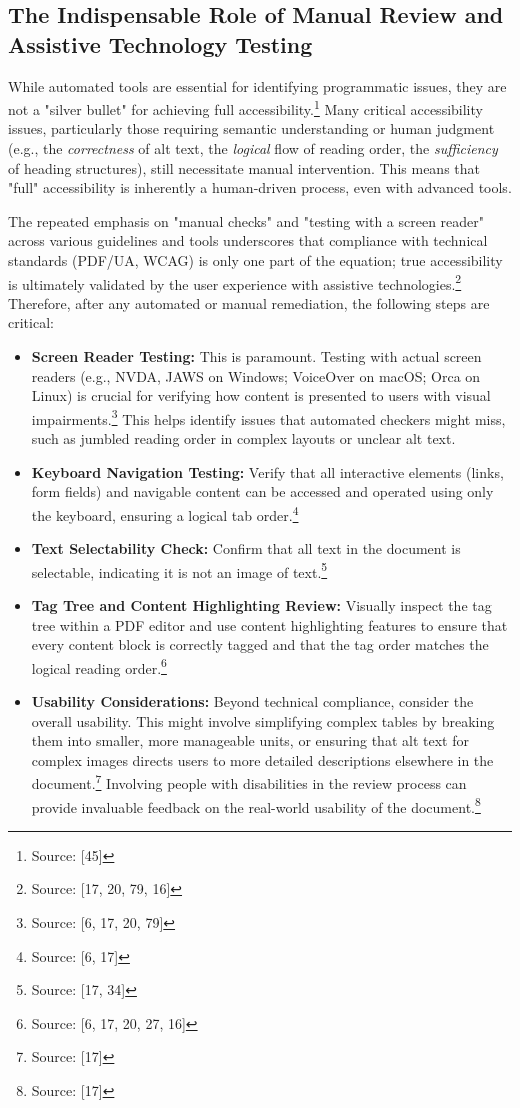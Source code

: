 \subsection{The Indispensable Role of Manual Review and Assistive Technology Testing}

While automated tools are essential for identifying programmatic issues, they are not a "silver bullet" for achieving full accessibility.\footnote{Source: [45]} Many critical accessibility issues, particularly those requiring semantic understanding or human judgment (e.g., the \textit{correctness} of alt text, the \textit{logical} flow of reading order, the \textit{sufficiency} of heading structures), still necessitate manual intervention. This means that "full" accessibility is inherently a human-driven process, even with advanced tools.

The repeated emphasis on "manual checks" and "testing with a screen reader" across various guidelines and tools underscores that compliance with technical standards (PDF/UA, WCAG) is only one part of the equation; true accessibility is ultimately validated by the user experience with assistive technologies.\footnote{Source: [17, 20, 79, 16]} Therefore, after any automated or manual remediation, the following steps are critical:

\begin{itemize}[noitemsep,topsep=0pt]
    \item \textbf{Screen Reader Testing:} This is paramount. Testing with actual screen readers (e.g., NVDA, JAWS on Windows; VoiceOver on macOS; Orca on Linux) is crucial for verifying how content is presented to users with visual impairments.\footnote{Source: [6, 17, 20, 79]} This helps identify issues that automated checkers might miss, such as jumbled reading order in complex layouts or unclear alt text.
    \item \textbf{Keyboard Navigation Testing:} Verify that all interactive elements (links, form fields) and navigable content can be accessed and operated using only the keyboard, ensuring a logical tab order.\footnote{Source: [6, 17]}
    \item \textbf{Text Selectability Check:} Confirm that all text in the document is selectable, indicating it is not an image of text.\footnote{Source: [17, 34]}
    \item \textbf{Tag Tree and Content Highlighting Review:} Visually inspect the tag tree within a PDF editor and use content highlighting features to ensure that every content block is correctly tagged and that the tag order matches the logical reading order.\footnote{Source: [6, 17, 20, 27, 16]}
    \item \textbf{Usability Considerations:} Beyond technical compliance, consider the overall usability. This might involve simplifying complex tables by breaking them into smaller, more manageable units, or ensuring that alt text for complex images directs users to more detailed descriptions elsewhere in the document.\footnote{Source: [17]} Involving people with disabilities in the review process can provide invaluable feedback on the real-world usability of the document.\footnote{Source: [17]}
\end{itemize}

